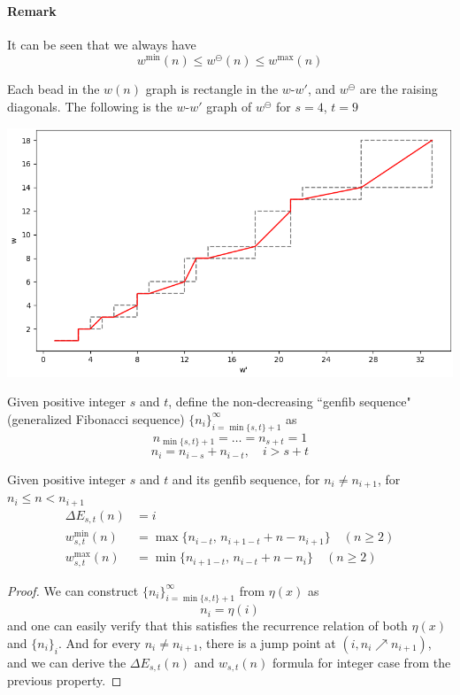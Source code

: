 \documentclass[]{article}
\begin{document}
\paragraph{Remark}
It can be seen that we always have
\[
w^{\min}(n)\le w^{\ominus}(n)\le w^{\max}(n)
\]

Each bead in the $w(n)$ graph is rectangle in the $w$-$w'$, and $w^{\ominus}$ are the raising diagonals. The following is the $w$-$w'$ graph of $w^{\ominus}$ for $s=4$, $t=9$

\includegraphics[scale=0.7]{w-n-v.png}

\vspace{1cm}
\begin{definition}[Fibonacci]
	Given positive integer $s$ and $t$, define the non-decreasing ``genfib sequence" (generalized Fibonacci sequence) $\{n_i\}_{i=\min\{s,t\}+1}^\infty$ as
	\[
	n_{\min\{s,t\}+1} = \dots = n_{s + t} = 1
	\]
	\[
	n_{i} = n_{i - s} + n_{i - t} , \quad i > s + t
	\]
\end{definition}

\vspace{1cm}
\begin{lemma}[Fibonacci]
	Given positive integer $s$ and $t$ and its genfib sequence, for $n_i \neq n_{i+1}$, for $n_i \le n < n_{i+1}$
	\begin{align*}
	\Delta E_{s,t}(n) &= i\\
	w^{\min}_{s,t}(n) &= \max\{n_{i - t},\, n_{i +1 - t} + n - n_{i+1}\}\quad(n\geq 2)	\\
	w^{\max}_{s,t}(n) &= \min\{n_{i +1 - t},\,n_{i - t} + n - n_{i} \} \quad(n\geq 2)
	\end{align*}
\end{lemma}
\begin{proof}
	We can construct $\{n_i\}_{i=\min\{s,t\}+1}^{\infty}$ from $\eta(x)$ as
	\[
	n_i = \eta(i)
	\]
	and one can easily verify that this satisfies the recurrence relation of both $\eta(x)$ and $\{n_i\}_{i}$. And for every $n_i \neq n_{i+1}$, there is a jump point at $(i,n_i\nearrow n_{i+1})$, and we can derive the $\Delta E_{s,t}(n)$ and $w_{s,t}(n)$ formula for integer case from the previous property.

\end{proof}
\end{document}
